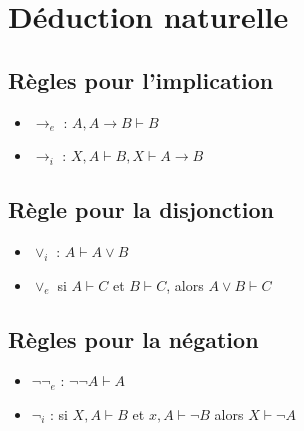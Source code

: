 \documentclass[10pt,a4paper]{article}
\begin{document}
\section{Déduction naturelle}
	\subsection{Règles pour l'implication}
		\begin{itemize}
			\item $\rightarrow_e$ : $A,A\rightarrow B \vdash B$
			\item $\rightarrow_i$ : $X,A \vdash B, X \vdash A \rightarrow B$
		\end{itemize}
	\subsection{Règle pour la disjonction}
		\begin{itemize}
			\item $\vee_i$ : $A\vdash A\vee B$
			\item $\vee_e$ si $A\vdash C$ et $B\vdash C$, alors $A\vee B\vdash C$
		\end{itemize}
	\subsection{Règles pour la négation}
		\begin{itemize}
			\item $\neg \neg_e$ : $\neg\neg A\vdash A$
			\item $\neg_i$ : si $X,A\vdash B$ et $x,A\vdash \neg B$ alors $X\vdash \neg A$
		\end{itemize}
	
\end{document}
